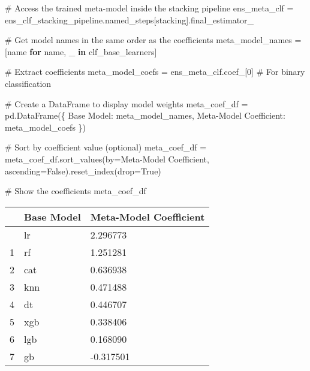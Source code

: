 \documentclass[
  letterpaper,
  DIV=11,
  numbers=noendperiod]{scrreprt}
\newenvironment{Shaded}{\begin{snugshade}}{\end{snugshade}}
\newcommand{\CommentTok}[1]{\textcolor[rgb]{0.37,0.37,0.37}{#1}}
\newcommand{\ControlFlowTok}[1]{\textcolor[rgb]{0.00,0.23,0.31}{\textbf{#1}}}
\newcommand{\DecValTok}[1]{\textcolor[rgb]{0.68,0.00,0.00}{#1}}
\newcommand{\KeywordTok}[1]{\textcolor[rgb]{0.00,0.23,0.31}{\textbf{#1}}}
\newcommand{\NormalTok}[1]{\textcolor[rgb]{0.00,0.23,0.31}{#1}}
\newcommand{\OperatorTok}[1]{\textcolor[rgb]{0.37,0.37,0.37}{#1}}
\newcommand{\StringTok}[1]{\textcolor[rgb]{0.13,0.47,0.30}{#1}}
\newcommand{\VariableTok}[1]{\textcolor[rgb]{0.07,0.07,0.07}{#1}}
\begin{document}
\begin{Shaded}
\begin{Highlighting}[]
\CommentTok{\# Access the trained meta{-}model inside the stacking pipeline}
\NormalTok{ens\_meta\_clf }\OperatorTok{=}\NormalTok{ ens\_clf\_stacking\_pipeline.named\_steps[}\StringTok{\textquotesingle{}stacking\textquotesingle{}}\NormalTok{].final\_estimator\_}

\CommentTok{\# Get model names in the same order as the coefficients}
\NormalTok{meta\_model\_names }\OperatorTok{=}\NormalTok{ [name }\ControlFlowTok{for}\NormalTok{ name, \_ }\KeywordTok{in}\NormalTok{ clf\_base\_learners]}

\CommentTok{\# Extract coefficients}
\NormalTok{meta\_model\_coefs }\OperatorTok{=}\NormalTok{ ens\_meta\_clf.coef\_[}\DecValTok{0}\NormalTok{]  }\CommentTok{\# For binary classification}

\CommentTok{\# Create a DataFrame to display model weights}
\NormalTok{meta\_coef\_df }\OperatorTok{=}\NormalTok{ pd.DataFrame(\{}
    \StringTok{\textquotesingle{}Base Model\textquotesingle{}}\NormalTok{: meta\_model\_names,}
    \StringTok{\textquotesingle{}Meta{-}Model Coefficient\textquotesingle{}}\NormalTok{: meta\_model\_coefs}
\NormalTok{\})}

\CommentTok{\# Sort by coefficient value (optional)}
\NormalTok{meta\_coef\_df }\OperatorTok{=}\NormalTok{ meta\_coef\_df.sort\_values(by}\OperatorTok{=}\StringTok{\textquotesingle{}Meta{-}Model Coefficient\textquotesingle{}}\NormalTok{, ascending}\OperatorTok{=}\VariableTok{False}\NormalTok{).reset\_index(drop}\OperatorTok{=}\VariableTok{True}\NormalTok{)}

\CommentTok{\# Show the coefficients}
\NormalTok{meta\_coef\_df}
\end{Highlighting}
\end{Shaded}

\begin{longtable}[]{@{}lll@{}}
\toprule\noalign{}
& Base Model & Meta-Model Coefficient \\
\midrule\noalign{}
\endhead
\bottomrule\noalign{}
\endlastfoot
0 & lr & 2.296773 \\
1 & rf & 1.251281 \\
2 & cat & 0.636938 \\
3 & knn & 0.471488 \\
4 & dt & 0.446707 \\
5 & xgb & 0.338406 \\
6 & lgb & 0.168090 \\
7 & gb & -0.317501 \\
\end{longtable}
\end{document}
